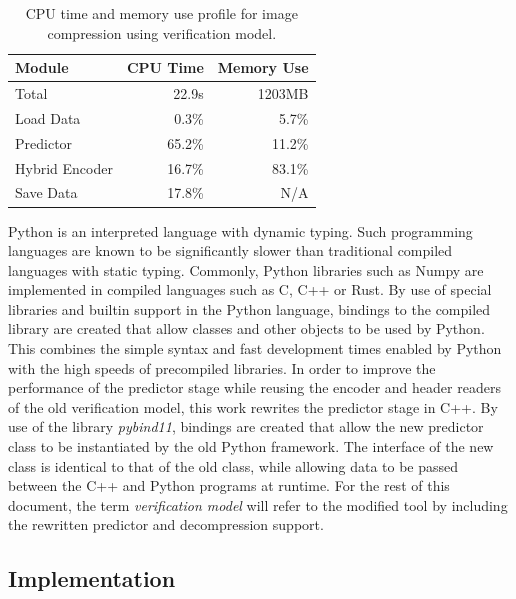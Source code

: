 \begin{table}[ht]
	\caption{\acrshort{CPU} time and memory use profile for image compression using verification model.}
	\label{tab:profile}
	\begin{center}
		\begin{tabular}{lrr}
			\hline
			\textbf{Module} & \textbf{CPU Time} & \textbf{Memory Use} \\
			\hline
			Total           & 22.9s             & 1203MB              \\
			Load Data       & 0.3\%             & 5.7\%               \\
			Predictor       & 65.2\%            & 11.2\%              \\
			Hybrid Encoder  & 16.7\%            & 83.1\%              \\
			Save Data       & 17.8\%            & N/A                 \\
			\hline
		\end{tabular}
	\end{center}
\end{table}

Python is an interpreted language with dynamic typing. Such programming languages are known to be significantly slower than traditional compiled languages with static typing. Commonly, Python libraries such as Numpy are implemented in compiled languages such as C, C++ or Rust. By use of special libraries and builtin support in the Python language, bindings to the compiled library are created that allow classes and other objects to be used by Python. This combines the simple syntax and fast development times enabled by Python with the high speeds of precompiled libraries. In order to improve the performance of the predictor stage while reusing the encoder and header readers of the old verification model, this work rewrites the predictor stage in C++. By use of the library \textit{pybind11}, bindings are created that allow the new predictor class to be instantiated by the old Python framework. The interface of the new class is identical to that of the old class, while allowing data to be passed between the C++ and Python programs at runtime. For the rest of this document, the term \textit{verification model} will refer to the modified tool by \citeauthor{vorhaugHyperspectralImageCompression2024} including the rewritten predictor and decompression support.

\subsection{Implementation}

